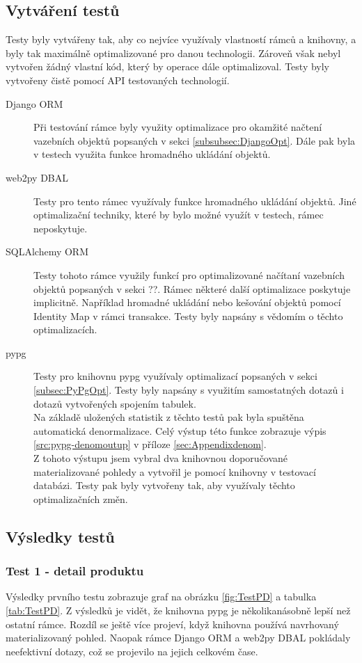 \documentclass[ing,male,java,dept456]{diploma}						%
\begin{document}
\subsection{Vytváření testů}
Testy byly vytvářeny tak, aby co nejvíce využívaly vlastností rámců a knihovny, a byly tak maximálně optimalizované pro danou technologii. Zároveň však nebyl vytvořen žádný vlastní kód, který by operace dále optimalizoval. Testy byly vytvořeny čistě pomocí API testovaných technologií. 

\begin{description}
\item[Django ORM] Při testování rámce byly využity optimalizace pro okamžité načtení vazebních objektů popsaných v sekci \ref{subsubsec:DjangoOpt}. Dále pak byla v testech využita funkce hromadného ukládání objektů.
\item[web2py DBAL] Testy pro tento rámec využívaly funkce hromadného ukládání objektů. Jiné optimalizační techniky, které by bylo možné využít v testech, rámec neposkytuje.
\item[SQLAlchemy ORM] Testy tohoto rámce využily funkcí pro optimalizované načítaní vazebních objektů popsaných v sekci ??. Rámec některé další optimalizace poskytuje implicitně. Například hromadné ukládání nebo kešování objektů pomocí Identity Map v rámci transakce. Testy byly napsány s vědomím o těchto optimalizacích.
\item[pypg] Testy pro knihovnu pypg využívaly optimalizací popsaných v sekci \ref{subsec:PyPgOpt}. Testy byly napsány s využitím samostatných dotazů i dotazů vytvořených spojením tabulek. \\
Na základě uložených statistik z těchto testů pak byla spuštěna automatická denormalizace. Celý výstup této funkce zobrazuje výpis \ref{src:pypg-denomoutup} v příloze \ref{sec:Appendixdenom}. \\
Z tohoto výstupu jsem vybral dva knihovnou doporučované materializované pohledy a vytvořil je pomocí knihovny v testovací databázi. Testy pak byly vytvořeny tak, aby využívaly těchto optimalizačních změn.
\end{description}

\subsection{Výsledky testů}

\subsubsection{Test 1 - detail produktu}
Výsledky prvního testu zobrazuje graf na obrázku \ref{fig:TestPD} a tabulka \ref{tab:TestPD}. Z výsledků je vidět, že knihovna pypg je několikanásobně lepší než ostatní rámce. Rozdíl se ještě více projeví, když knihovna používá navrhovaný materializovaný pohled. Naopak rámce Django ORM a web2py DBAL pokládaly neefektivní dotazy, což se projevilo na jejich celkovém čase. 
\end{document}
